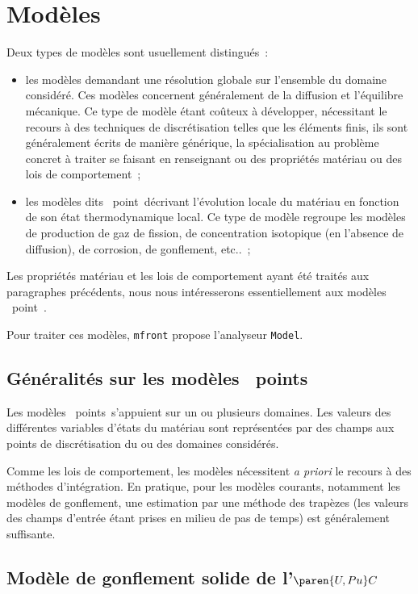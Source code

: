 \documentclass[rectoverso,pleiades,pstricks,leqno,anti]{texmf/note_technique_2010}
\newcommand{\mfront}{\texttt{mfront}}
\newcommand{\upuc}{$\paren{U,Pu}C$}
\begin{document}
\clearpage
\newpage
\section{Modèles}

Deux types de modèles sont usuellement distingués~:
\begin{itemize}
\item les modèles demandant une résolution globale sur l'ensemble du
  domaine considéré. Ces modèles concernent généralement de la
  diffusion et l'équilibre mécanique. Ce type de modèle étant coûteux
  à développer, nécessitant le recours à des techniques de
  discrétisation telles que les éléments finis, ils sont généralement
  écrits de manière générique, la spécialisation au problème concret à
  traiter se faisant en renseignant ou des propriétés matériau ou des
  lois de comportement~;
\item les modèles dits \og~point~\fg décrivant l'évolution locale du
  matériau en fonction de son état thermodynamique local. Ce type de modèle
  regroupe les modèles de production de gaz de fission, de concentration
  isotopique (en l'absence de diffusion), de corrosion, de gonflement, etc..~;
\end{itemize}

Les propriétés matériau et les lois de comportement ayant été traités aux
paragraphes précédents, nous nous intéresserons essentiellement aux 
modèles \og~point~\fg.

Pour traiter ces modèles, \mfront{} propose l'analyseur \texttt{Model}.

\subsection{Généralités sur les modèles \og~points~\fg}

Les modèles \og~points~\fg s'appuient sur un ou plusieurs domaines.
Les valeurs des différentes variables d'états du matériau sont
représentées par des champs aux points de discrétisation du ou
des domaines considérés.

Comme les lois de comportement, les modèles nécessitent
\textit{a priori} le recours à des méthodes d'intégration.
En pratique, pour les modèles courants, notamment les modèles
de gonflement, une estimation par une méthode des
trapèzes (les valeurs des champs d'entrée étant prises en
milieu de pas de temps) est généralement suffisante.

\subsection{Modèle de gonflement solide de l'\upuc{}}
\end{document}
